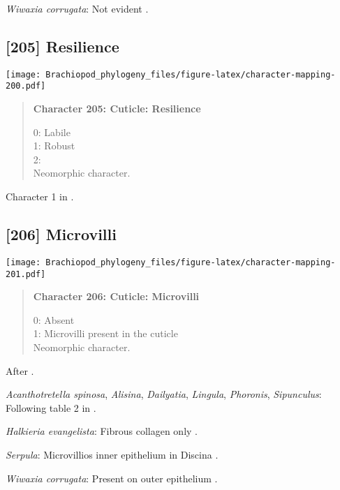 \documentclass[openany]{book}
\theoremstyle{definition}
\theoremstyle{definition}
\theoremstyle{definition}
\theoremstyle{remark}
\begin{document}
\hypertarget{Wiwaxia_corrugata-coding-204}{}
\emph{Wiwaxia corrugata}: Not evident \citep{BereiterHahn1984}.

\subsection*{{[}205{]} Resilience}\label{resilience}

\texttt{[image: Brachiopod\_phylogeny\_files/figure-latex/character-mapping-200.pdf]}

\begin{quote}
\textbf{Character 205: Cuticle: Resilience}

0: Labile\\
1: Robust\\
2:\\
Neomorphic character.
\end{quote}

Character 1 in \citet{Haszprunar2000}.

\subsection*{{[}206{]} Microvilli}\label{microvilli}

\texttt{[image: Brachiopod\_phylogeny\_files/figure-latex/character-mapping-201.pdf]}

\begin{quote}
\textbf{Character 206: Cuticle: Microvilli}

0: Absent\\
1: Microvilli present in the cuticle\\
Neomorphic character.
\end{quote}

After \citet{Borisanova2015}.

\hypertarget{Acanthotretella_spinosa-coding-206}{}
\emph{Acanthotretella spinosa}, \emph{Alisina}, \emph{Dailyatia},
\emph{Lingula}, \emph{Phoronis}, \emph{Sipunculus}: Following table 2 in
\citet{Borisanova2015}.

\hypertarget{Halkieria_evangelista-coding-206}{}
\emph{Halkieria evangelista}: Fibrous collagen only
\citep{BereiterHahn1984}.

\hypertarget{Serpula-coding-206}{}
\emph{Serpula}: Microvillios inner epithelium in Discina
\citep{Williams1997Introduction}.

\hypertarget{Wiwaxia_corrugata-coding-206}{}
\emph{Wiwaxia corrugata}: Present on outer epithelium
\citep{BereiterHahn1984}.
\end{document}
